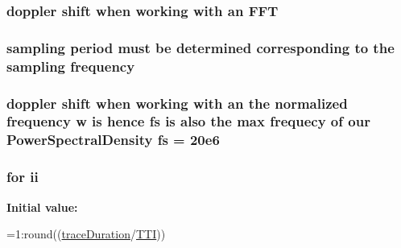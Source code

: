 {\subsubsection[{\texorpdfstring{F\+FT}{FFT}}]{\setlength{\rightskip}{0pt plus 5cm}doppler shift when working with an F\+FT}\hypertarget{lte_2model_2fading-traces_2fading__trace__generator_8m_ac4962f4e70dbd9d6f4994fd9698b6932}{}\label{lte_2model_2fading-traces_2fading__trace__generator_8m_ac4962f4e70dbd9d6f4994fd9698b6932}
\subsubsection[{\texorpdfstring{frequency}{frequency}}]{\setlength{\rightskip}{0pt plus 5cm}sampling {\bf period} must be determined corresponding to the sampling frequency}\hypertarget{lte_2model_2fading-traces_2fading__trace__generator_8m_a09045328d6d7e16aa4013f526cc6993d}{}\label{lte_2model_2fading-traces_2fading__trace__generator_8m_a09045328d6d7e16aa4013f526cc6993d}
\subsubsection[{\texorpdfstring{fs}{fs}}]{\setlength{\rightskip}{0pt plus 5cm}doppler shift when working with an the normalized {\bf frequency} {\bf w} is hence fs is also the {\bf max} frequecy of our Power\+Spectral\+Density fs = 20e6}\hypertarget{lte_2model_2fading-traces_2fading__trace__generator_8m_a9eba99c13508cc57a010f196f60992ff}{}\label{lte_2model_2fading-traces_2fading__trace__generator_8m_a9eba99c13508cc57a010f196f60992ff}
\subsubsection[{\texorpdfstring{ii}{ii}}]{\setlength{\rightskip}{0pt plus 5cm}for ii}\hypertarget{lte_2model_2fading-traces_2fading__trace__generator_8m_abf9d47cd7d4fbc942e618bb1977019c2}{}\label{lte_2model_2fading-traces_2fading__trace__generator_8m_abf9d47cd7d4fbc942e618bb1977019c2}
{\bfseries Initial value\+:}
\begin{DoxyCode}
=1:round((\hyperlink{lte_2model_2fading-traces_2fading__trace__generator_8m_a0c1585818ec8cef3da5de969db327075}{traceDuration}/\hyperlink{lte_2model_2fading-traces_2fading__trace__generator_8m_ac1869da1923b6ac2fd774dc4fe76bf1e}{TTI}))
        

\end{DoxyCode}}
